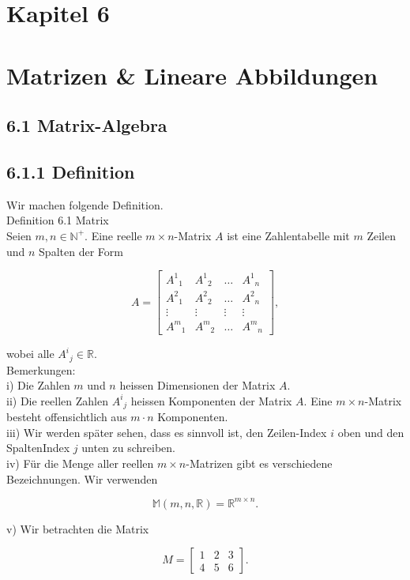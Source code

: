 \documentclass[a4paper,12pt]{article}
\begin{document}
\section*{Kapitel 6}
\section*{Matrizen \& Lineare Abbildungen}
\subsection*{6.1 Matrix-Algebra}
\subsection*{6.1.1 Definition}
Wir machen folgende Definition.\\
Definition 6.1 Matrix\\
Seien $m, n \in \mathbb{N}^{+}$. Eine reelle $m \times n$-Matrix $A$ ist eine Zahlentabelle mit $m$ Zeilen und $n$ Spalten der Form

\[
A=\left[\begin{array}{llll}
A^{1}{ }_{1} & A^{1}{ }_{2} & \ldots & A^{1}{ }_{n}  \tag{6.1}\\
A^{2}{ }_{1} & A^{2}{ }_{2} & \ldots & A^{2}{ }_{n} \\
\vdots & \vdots & \vdots & \vdots \\
A^{m}{ }_{1} & A^{m}{ }_{2} & \ldots & A^{m}{ }_{n}
\end{array}\right],
\]

wobei alle $A^{i}{ }_{j} \in \mathbb{R}$.\\
Bemerkungen:\\
i) Die Zahlen $m$ und $n$ heissen Dimensionen der Matrix $A$.\\
ii) Die reellen Zahlen $A^{i}{ }_{j}$ heissen Komponenten der Matrix $A$. Eine $m \times n$-Matrix besteht offensichtlich aus $m \cdot n$ Komponenten.\\
iii) Wir werden später sehen, dass es sinnvoll ist, den Zeilen-Index $i$ oben und den SpaltenIndex $j$ unten zu schreiben.\\
iv) Für die Menge aller reellen $m \times n$-Matrizen gibt es verschiedene Bezeichnungen. Wir verwenden

\begin{equation*}
\mathbb{M}(m, n, \mathbb{R})=\mathbb{R}^{m \times n} . \tag{6.2}
\end{equation*}

v) Wir betrachten die Matrix

\[
M=\left[\begin{array}{lll}
1 & 2 & 3  \tag{6.3}\\
4 & 5 & 6
\end{array}\right] .
\]
\end{document}
